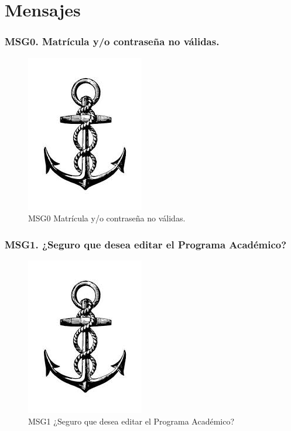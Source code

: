 \chapter{Mensajes}

\subsection{MSG0. Matrícula y/o contraseña no válidas.}
    \begin{figure}[htbp]
        \begin{center}
            \includegraphics[width=.4\textwidth]{images/MSG/ancla}
            \caption{MSG0 Matrícula y/o contraseña no válidas.}
            \label{fig:MSG0}
        \end{center}
    \end{figure}

\subsection{MSG1. ¿Seguro que desea editar el Programa Académico?}
    \begin{figure}[htbp]
        \begin{center}
            \includegraphics[width=.4\textwidth]{images/MSG/ancla}
            \caption{MSG1 ¿Seguro que desea editar el Programa Académico?}
            \label{fig:MSG1}
        \end{center}
    \end{figure}

